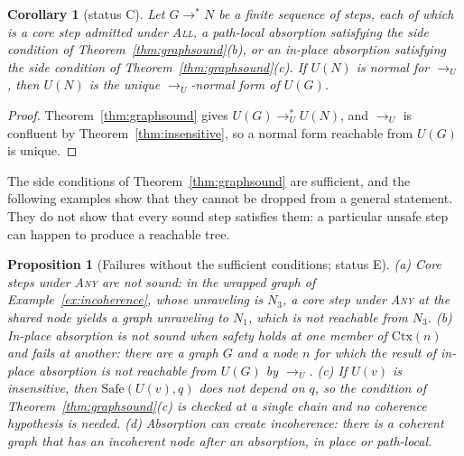 \documentclass[11pt]{article}
\newtheorem{proposition}[theorem]{Proposition}
\newtheorem{corollary}[theorem]{Corollary}
\theoremstyle{definition}
\theoremstyle{remark}
\newcommand{\Ctx}{\mathrm{Ctx}}
\newcommand{\Et}{status E}
\newcommand{\Ct}{status C}
\begin{document}
\begin{corollary}[\Ct]\label{cor:graphnf}
Let $G\to^{*}N$ be a finite sequence of steps, each of which is a core step admitted under \textsc{All}, a path-local absorption satisfying the side condition of Theorem~\ref{thm:graphsound}(b), or an in-place absorption satisfying the side condition of Theorem~\ref{thm:graphsound}(c). If $U(N)$ is normal for $\to_U$, then $U(N)$ is the unique $\to_U$-normal form of $U(G)$.
\end{corollary}

\begin{proof}
Theorem~\ref{thm:graphsound} gives $U(G)\to_U^{*}U(N)$, and $\to_U$ is confluent by Theorem~\ref{thm:insensitive}, so a normal form reachable from $U(G)$ is unique.
\end{proof}

The side conditions of Theorem~\ref{thm:graphsound} are sufficient, and the following examples show that they cannot be dropped from a general statement. They do not show that every sound step satisfies them: a particular unsafe step can happen to produce a reachable tree.

\begin{proposition}[Failures without the sufficient conditions; \Et]\label{prop:graphnec}
(a) Core steps under \textsc{Any} are not sound: in the wrapped graph of Example~\ref{ex:incoherence}, whose unraveling is $N_3$, a core step under \textsc{Any} at the shared node yields a graph unraveling to $N_1$, which is not reachable from $N_3$. (b) In-place absorption is not sound when safety holds at one member of $\Ctx(n)$ and fails at another: there are a graph $G$ and a node $n$ for which the result of in-place absorption is not reachable from $U(G)$ by $\to_U$. (c) If $U(v)$ is insensitive, then $\mathrm{Safe}(U(v),q)$ does not depend on $q$, so the condition of Theorem~\ref{thm:graphsound}(c) is checked at a single chain and no coherence hypothesis is needed. (d) Absorption can create incoherence: there is a coherent graph that has an incoherent node after an absorption, in place or path-local.
\end{proposition}
\end{document}
